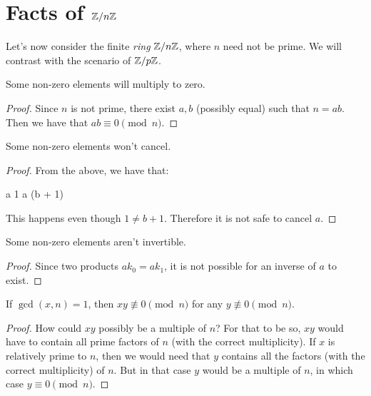 \section{Facts of $\mathbb{Z} / n\mathbb{Z}$}

Let's now consider the finite \emph{ring} $\mathbb{Z} / n\mathbb{Z}$, where $n$ need not
be prime. We will contrast with the scenario of $\mathbb{Z} / p\mathbb{Z}$.

\begin{lemma}
  Some non-zero elements will multiply to zero.
\end{lemma}

\begin{proof}
  Since $n$ is not prime, there exist $a, b$ (possibly equal) such that
  $n = ab$. Then we have that $ab \equiv 0 \pmod{n}$.
\end{proof}

\begin{lemma}
  Some non-zero elements won't cancel.
\end{lemma}

\begin{proof}
  From the above, we have that:

  \begin{nedqn}
    a 1
  \equivcol
    a (b + 1) 
  \end{nedqn}

  This happens even though $1 \ne b + 1$. Therefore it is not safe to
  cancel $a$.
\end{proof}

\begin{lemma}
  Some non-zero elements aren't invertible.
\end{lemma}

\begin{proof}
  Since two products $ak_0 = ak_1$, it is not possible for an inverse of
  $a$ to exist.
\end{proof}

\begin{lemma}
  If $\gcd(x, n) = 1$, then $xy \not\equiv 0 \pmod{n}$ for any
  $y\not\equiv 0 \pmod{n}$.
\end{lemma}

\begin{proof}
  How could $xy$ possibly be a multiple of $n$? For that to be so, $xy$
  would have to contain all prime factors of $n$ (with the correct
  multiplicity). If $x$ is relatively prime to $n$, then we would need
  that $y$ contains all the factors (with the correct multiplicity) of
  $n$. But in that case $y$ would be a multiple of $n$, in which case $y
  \equiv 0 \pmod{n}$.
\end{proof}


